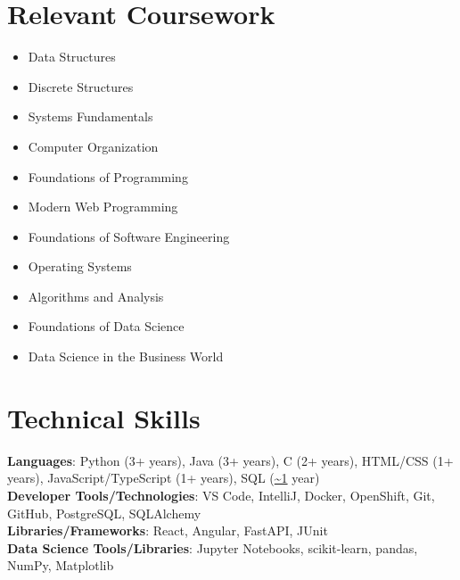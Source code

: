 \documentclass[letterpaper,11pt]{article}
\newcommand{\resumeSubHeadingListStart}{\begin{itemize}[leftmargin=0.0in, label={}]}
\newcommand{\resumeSubHeadingListEnd}{\end{itemize}}
\begin{document}
\section{Relevant Coursework}
    \vspace{-2pt}
        \begin{multicols}{4}
            \begin{itemize}[itemsep=-5pt, parsep=3pt]
                \item\small Data Structures
                \item Discrete Structures
                \item Systems Fundamentals
                \item Computer Organization
                \item Foundations of Programming
                \item Modern Web Programming
                \item Foundations of Software Engineering
                \item Operating Systems
                \item Algorithms and Analysis
                \item Foundations of Data Science
                \item Data Science in the Business World
            \end{itemize}
        \end{multicols}
        \vspace*{2.0\multicolsep}
\vspace{-5pt}

\section{Technical Skills}
 \vspace{-2pt}
 \begin{itemize}[leftmargin=0.15in, label={}]
    \small{\item{
     \textbf{Languages}{: Python (3+ years), Java (3+ years), C (2+ years), HTML/CSS (1+ years), JavaScript/TypeScript (1+ years), SQL (\url{~1} year)} \\
     \textbf{Developer Tools/Technologies}{: VS Code, IntelliJ, Docker, OpenShift, Git, GitHub, PostgreSQL, SQLAlchemy} \\
     \textbf{Libraries/Frameworks}{: React, Angular, FastAPI, JUnit} \\
     \textbf{Data Science Tools/Libraries}{: Jupyter Notebooks, scikit-learn, pandas, NumPy, Matplotlib} \\
    }}
 \end{itemize}
\vspace{-20pt}
\end{document}
